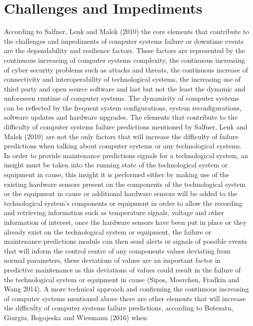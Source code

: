 \newpage

\section{Challenges and Impediments}

According to Salfner, Lenk and Malek (2010) the core elements that contribute to the challenges and impediments
of computer systems failure or downtime events are the dependability and resilience factors. These factors are
represented by the continuous increasing of computer systems complexity, the continuous increasing of cyber
security problems such as attacks and threats, the continuous increase of connectivity and interoperability
of technological systems, the increasing use of third party and open source software and last but not the
least the dynamic and unforeseen runtime of computer systems. The dynamicity of computer systems can be
reflected by the frequent system configurations, system reconfigurations, software updates and hardware upgrades.
The elements that contribute to the difficulty of computer systems failure predictions mentioned by Salfner, Lenk
and Malek (2010) are not the only factors that will increase the difficulty of failure predictions when talking
about computer systems or any technological systems. In order to provide maintenance predictions signals for a
technological system, an insight must be taken into the running state of the technological system or equipment
in cause, this insight it is performed either by making use of the existing hardware sensors present on the
components of the technological system or the equipment in cause or additional hardware sensors will be added
to the technological system’s components or equipment in order to allow the recording and retrieving information
such as temperature signals, voltage and other information of interest, once the hardware sensors have been put
in place or they already exist on the technological system or equipment, the failure or maintenance predictions
module can then send alerts or signals of possible events that will inform the control centre of any components
values deviating from normal parameters, these deviations of values are an important factor in predictive
maintenance as this deviations of values could result in the failure of the technological system or equipment
in cause (Sipos, Moerchen, Fradkin and Wang 2014). A more technical approach and confirming the continuous
increasing of computer systems mentioned above  there are other elements that will increase the difficulty of
computer systems failure predictions, according to Botezatu, Giurgiu, Bogojeska and Wiesmann (2016) when
